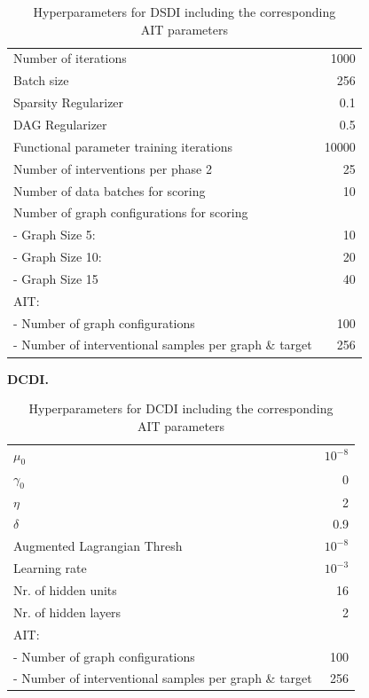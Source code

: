 \documentclass[nohyperref]{article}
\theoremstyle{plain}
\theoremstyle{definition}
\theoremstyle{remark}
\begin{document}
\begin{table}[h!]
    \centering
    \caption{Hyperparameters for DSDI including the corresponding \\ AIT parameters}
    \begin{tabular}{lr}
    \toprule
        Number of iterations & 1000  \\
        Batch size & 256 \\
        Sparsity Regularizer & 0.1 \\
        DAG Regularizer & 0.5 \\
        Functional parameter training iterations & 10000 \\
        Number of interventions per phase 2 & 25 \\
        Number of data batches for scoring & 10 \\
        Number of graph configurations for scoring & \\
                    - Graph Size 5:   & 10   \\
                    - Graph Size 10:  & 20   \\
                    - Graph Size 15   & 40   \\ 
        \midrule
        AIT: \\
        - Number of graph configurations & 100 \\
        - Number of interventional samples per graph \& target & 256 \\
    \bottomrule
    \end{tabular}
    \label{tab:hyperparam_dsdi}
\end{table}

\textbf{DCDI.} 
\begin{table}[h!]
    \centering
    \caption{Hyperparameters for DCDI including the corresponding \\ AIT parameters}
    \begin{tabular}{lr}
    \toprule
        $\mu_0$ & $10^{-8}$  \\
        $\gamma_0$ & 0 \\
        $\eta$ & 2 \\
        $\delta$ & 0.9 \\
        Augmented Lagrangian Thresh & $10^{-8}$ \\
        Learning rate & $10^{-3}$ \\
        Nr. of hidden units & 16 \\
        Nr. of hidden layers & 2 \\
        \midrule
        AIT: \\
        - Number of graph configurations & 100 \\
        - Number of interventional samples per graph \& target & 256  \\
    \bottomrule
    \end{tabular}
    \label{tab:hyperparam_dcdi}
\end{table}
\clearpage
\end{document}
